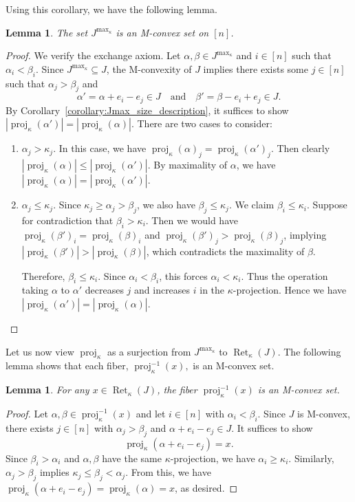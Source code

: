 \documentclass[10pt,a4paper]{amsart}
\newtheorem{lemma}[theorem]{Lemma}
\DeclareMathOperator{\proj}{proj}              %
\newcommand{\kproj}{\proj_{\kappa}}            %
\DeclareMathOperator{\Ret}{Ret}                %
\newcommand{\RetK}{\Ret_{\kappa}}              %
\newcommand{\Jmax}{J^{\max_{\kappa}}}
\begin{document}
Using this corollary, we have the following lemma.
\begin{lemma} \label{lemma:Jmax_is_Mconvex}
    The set $\Jmax$ is an M-convex set on $[n]$.
\end{lemma}
\begin{proof}
    We verify the exchange axiom. Let $\alpha,\beta \in \Jmax$ and $i \in [n]$ such that $\alpha_i < \beta_i$. Since $\Jmax \subseteq J$, the M-convexity of $J$ implies there exists some $j \in [n]$ such that $\alpha_j > \beta_j$ and \[
    \alpha' = \alpha +e_i -e_j \in J \quad \text{and}\quad \beta' = \beta - e_i +e_j \in J.
    \]
    By Corollary~\ref{corollary:Jmax_size_description}, it suffices to show $|\kproj(\alpha')| = |\kproj(\alpha)|$. There are two cases to consider:
    \begin{enumerate}[label=\textit{Case \arabic*:}, leftmargin=*, align=left]
        \item $\alpha_j > \kappa_j$. In this case, we have $\kproj(\alpha)_j = \kproj(\alpha')_j$. Then clearly $|\kproj(\alpha)| \leq |\kproj(\alpha')|$. By maximality of $\alpha$, we have $|\kproj(\alpha)| = |\kproj(\alpha')|$.
        \item $\alpha_j \leq \kappa_j$. Since $\kappa_j \geq \alpha_j > \beta_j$, we also have $\beta_j \leq \kappa_j$. We claim $\beta_i \leq \kappa_i$. Suppose for contradiction that $\beta_i > \kappa_i$. Then we would have $\kproj(\beta')_i = \kproj(\beta)_i$ and $\kproj(\beta')_j > \kproj(\beta)_j$, implying $|\kproj(\beta')| > |\kproj(\beta)|$, which contradicts the maximality of $\beta$.
        
        Therefore, $\beta_i \leq \kappa_i$. Since $\alpha_i < \beta_i$, this forces $\alpha_i < \kappa_i$. Thus the operation taking $\alpha$ to $\alpha'$ decreases $j$ and increases $i$ in the $\kappa$-projection. Hence we have $|\kproj(\alpha')| = |\kproj(\alpha)|$.
    \end{enumerate}
\end{proof}
Let us now view $\kproj$ as a surjection from $\Jmax$ to $\RetK(J)$. The following lemma shows that each fiber, $\kproj^{-1}(x),$ is an M-convex set.
\begin{lemma}\label{lemma:fibers_Mconvex}
    For any $x \in \RetK(J)$, the fiber $\kproj^{-1}(x)$ is an M-convex set.
\end{lemma}
\begin{proof}
    Let $\alpha,\beta \in \kproj^{-1}(x)$ and let $i \in [n]$ with $\alpha_i < \beta_i$. Since $J$ is M-convex, there exists $j \in [n]$ with $\alpha_j > \beta_j$ and $\alpha+e_i -e_j \in J$. It suffices to show \[
    \kproj(\alpha +e_i -e_j) = x.
    \]
    Since $\beta_i > \alpha_i$ and $\alpha,\beta$ have the same $\kappa$-projection, we have $\alpha_i \geq \kappa_i$. Similarly, $\alpha_j > \beta_j$ implies $\kappa_j \leq \beta_j < \alpha_j$. From this, we have $\kproj(\alpha + e_i -e_j) = \kproj(\alpha) = x$, as desired.
\end{proof}
\end{document}
